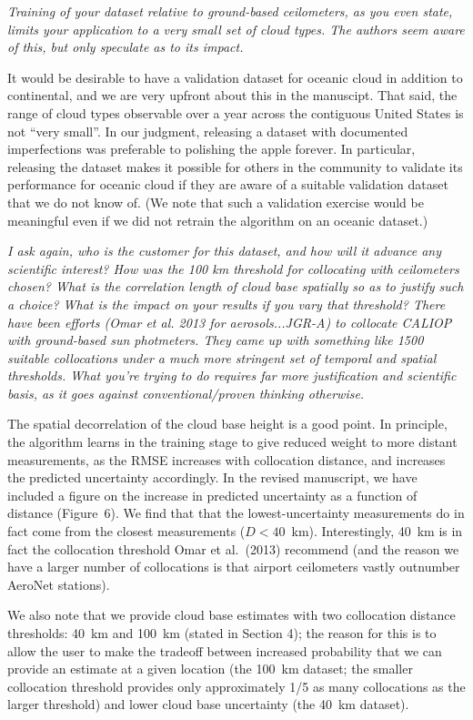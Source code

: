\documentclass[12pt,a4paper]{responses}
\begin{document}
\textit{Training of your dataset relative to ground-based ceilometers, as you
  even state, limits your application to a very small set of cloud types. The
  authors seem aware of this, but only speculate as to its impact.}

It would be desirable to have a validation dataset for oceanic cloud in addition
to continental, and we are very upfront about this in the manuscipt.  That said,
the range of cloud types observable over a year across the contiguous United
States is not ``very small''.  In our judgment, releasing a dataset with documented
imperfections was preferable to polishing the apple forever.  In particular,
releasing the dataset makes it possible for others in the community to validate
its performance for oceanic cloud if they are aware of a suitable validation
dataset that we do not know of.  (We note that such a validation exercise would
be meaningful even if we did not retrain the algorithm on an oceanic dataset.)

\textit{I ask again, who is the customer for this dataset, and how will it
  advance any scientific interest? How was the 100 km threshold for collocating
with ceilometers chosen?  What is the correlation length of cloud base spatially so as
to justify such a choice? What is the impact on your results if you vary that threshold?
There have been efforts (Omar et al. 2013 for aerosols...JGR-A) to collocate CALIOP
with ground-based sun photmeters.  They came up with something like 1500 suitable
collocations under a much more stringent set of temporal and spatial thresholds. What
you’re trying to do requires far more justification and scientific basis, as it goes against
conventional/proven thinking otherwise.}

The spatial decorrelation of the cloud base height is a good point.  In
principle, the algorithm learns in the training stage to give reduced weight to
more distant measurements, as the RMSE increases with collocation distance, and
increases the predicted uncertainty accordingly.  In the revised manuscript, we
have included a figure on the increase in predicted uncertainty as a function of
distance (Figure~6).  We find that that the lowest-uncertainty measurements do
in fact come from the closest measurements ($D < 40$~km).  Interestingly, 40~km
is in fact the collocation threshold Omar et al.~(2013) recommend (and the
reason we have a larger number of collocations is that airport ceilometers
vastly outnumber AeroNet stations).

We also note that we provide cloud base estimates with two collocation distance
thresholds: 40~km and 100~km (stated in Section 4); the reason for this is to
allow the user to make the tradeoff between increased probability that we can
provide an estimate at a given location (the 100~km dataset; the smaller
collocation threshold provides only approximately 1/5 as many collocations as
the larger threshold) and lower cloud base uncertainty (the 40~km dataset).
\end{document}
